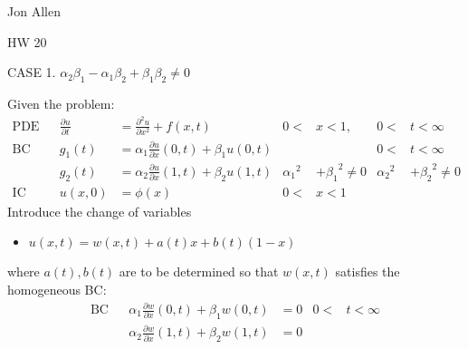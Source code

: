 \documentclass{article}
\begin{document}
Jon Allen

HW 20

CASE 1. $\alpha_2\beta_1-\alpha_1\beta_2+\beta_1\beta_2\ne0$

Given the problem:
\begin{align*}
  \text{PDE}&&\frac{\partial u}{\partial t}&=\frac{\partial ^2u}{\partial x^2}+f(x,t)&0<&x<1,&0<&t<\infty\\
  \text{BC}&&g_1(t)&=\alpha_1\frac{\partial u}{\partial x}(0,t)+\beta_1u(0,t)&&&0<&t<\infty\\
  &&g_2(t)&=\alpha_2\frac{\partial u}{\partial x}(1,t)+\beta_2u(1,t)&{\alpha_1}^2&+{\beta_1}^2\ne0&{\alpha_2}^2&+{\beta_2}^2\ne0\\
  \text{IC}&&u(x,0)&=\phi(x)&0<&x<1
\end{align*}
Introduce the change of variables
\begin{itemize}
\item
$u(x,t)=w(x,t)+a(t)x+b(t)(1-x)$
\end{itemize}
where $a(t), b(t)$ are to be determined so that $w(x,t)$ satisfies the homogeneous BC:
\begin{align*}
  \text{BC}&&\alpha_1\frac{\partial w}{\partial x}(0,t)+\beta_1w(0,t)&=0&0<&t<\infty\\
  &&\alpha_2\frac{\partial w}{\partial x}(1,t)+\beta_2w(1,t)&=0
\end{align*}
\end{document}
